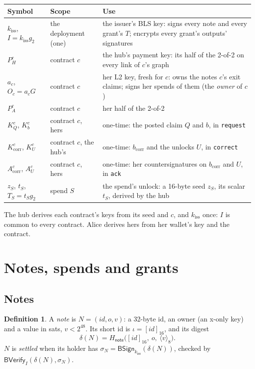 \documentclass[11pt]{article}
\theoremstyle{plain}
\theoremstyle{definition}
\newtheorem{definition}{Definition}
\newcommand{\bcorr}{b_{\mathrm{corr}}}
\newcommand{\tx}[1]{\texttt{#1}}
\newcommand{\be}[2]{\langle #1\rangle_{#2}}
\newcommand{\pre}[2]{[#1]_{#2}}
\newcommand{\Ht}[1]{H_{\textsf{#1}}}
\newcommand{\kiss}{k_{\mathrm{iss}}}
\newcommand{\PH}{P_H^{c}}
\newcommand{\Oc}{O_c}
\newcommand{\KQ}{K_{Q}^{c}}
\newcommand{\Kb}{K_{b}^{c}}
\newcommand{\Kcorr}{K_{\mathrm{corr}}^{c}}
\newcommand{\KU}{K_{U}^{c}}
\newcommand{\Acorr}{A_{\mathrm{corr}}^{c}}
\newcommand{\AU}{A_{U}^{c}}
\newcommand{\BSign}{\mathsf{BSign}}
\newcommand{\BVfy}{\mathsf{BVerify}}
\begin{document}
\begin{center}
\begin{tabularx}{\linewidth}{llL}
\toprule
Symbol & Scope & Use \\
\midrule
$\kiss$, $I = \kiss g_2$ & the deployment (one) & the issuer's BLS key: signs every note and every grant's $T$; encrypts every grant's outputs' signatures \\
$\PH$ & contract $c$ & the hub's payment key: its half of the 2-of-2 on every link of $c$'s graph \\
$a_c$, $\Oc = a_cG$ & contract $c$ & her L2 key, fresh for $c$: owns the notes $c$'s exit claims; signs her spends of them (the \emph{owner} of $c$) \\
$P_A^c$ & contract $c$ & her half of the 2-of-2 \\
$\KQ$, $\Kb$ & contract $c$, hers & one-time: the posted claim $Q$ and $b$, in \tx{request} \\
$\Kcorr$, $\KU$ & contract $c$, the hub's & one-time: $\bcorr$ and the unlocks $U$, in \tx{correct} \\
$\Acorr$, $\AU$ & contract $c$, hers & one-time: her countersignatures on $\bcorr$ and $U$, in \tx{ack} \\
$z_S$, $t_S$, $T_S = t_S g_2$ & spend $S$ & the spend's unlock: a 16-byte seed $z_S$, its scalar $t_S$, derived by the hub \\
\bottomrule
\end{tabularx}
\end{center}

The hub derives each contract's keys from its seed and $c$, and $\kiss$
once: $I$ is common to every contract. Alice derives hers from her
wallet's key and the contract.

\section{Notes, spends and grants}

\subsection{Notes}

\begin{definition}
A \emph{note} is $N = (\mathit{id}, o, v)$: a 32-byte id, an owner (an
x-only key) and a value in sats, $v < 2^{48}$. Its short id is $\iota =
\pre{\mathit{id}}{16}$, and its digest
\[
  \delta(N) = \Ht{note}\big(\pre{\mathit{id}}{16},\ o,\ \be{v}{8}\big).
\]
$N$ is \emph{settled} when its holder has $\sigma_N = \BSign_{\kiss}(\delta(N))$,
checked by $\BVfy_I(\delta(N), \sigma_N)$.
\end{definition}
\end{document}
